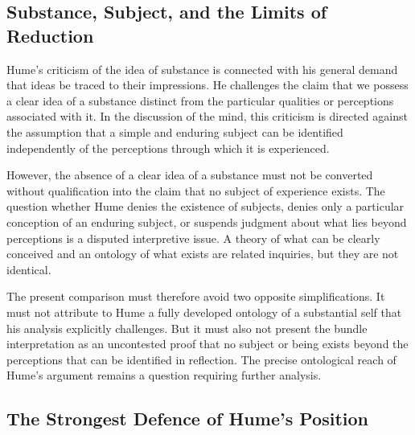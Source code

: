 \subsection{Substance, Subject, and the Limits of Reduction}
\label{subsec:ch08-hume-substance}

\label{para:VS.B01.P01.C08.S09.SS09.P001}

Hume's criticism of the idea of substance is connected
with his general demand that ideas be traced to
their impressions. He challenges the claim that
we possess a clear idea of a substance distinct
from the particular qualities or perceptions
associated with it. In the discussion of the
mind, this criticism is directed against the
assumption that a simple and enduring subject
can be identified independently of the perceptions
through which it is experienced.
\cite[1.4.5--6, SBN 232--263]{HumeTreatise}

\label{para:VS.B01.P01.C08.S09.SS09.P002}

However, the absence of a clear idea of a substance
must not be converted without qualification into
the claim that no subject of experience exists.
The question whether Hume denies the existence
of subjects, denies only a particular conception
of an enduring subject, or suspends judgment
about what lies beyond perceptions is a disputed
interpretive issue. A theory of what can be
clearly conceived and an ontology of what exists
are related inquiries, but they are not identical.
\cite{QuRadcliffeHume2026,Cottrell2015}

\label{para:VS.B01.P01.C08.S09.SS09.P003}

The present comparison must therefore avoid two
opposite simplifications. It must not attribute
to Hume a fully developed ontology of a substantial
self that his analysis explicitly challenges.
But it must also not present the bundle interpretation
as an uncontested proof that no subject or being
exists beyond the perceptions that can be identified
in reflection. The precise ontological reach
of Hume's argument remains a question requiring
further analysis.



\subsection{The Strongest Defence of Hume's Position}
\label{subsec:ch08-hume-defence}

